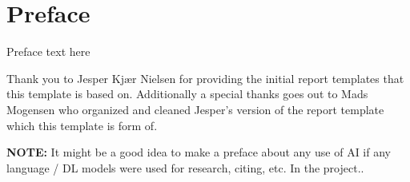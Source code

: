 \chapter*{Preface}\label{ch:preface}

Preface text here\n

\noindent Thank you to Jesper Kjær Nielsen for providing the initial report templates that this template is based on. Additionally a special thanks goes out to Mads Mogensen who organized and cleaned Jesper's version of the report template which this template is form of.\n

\noindent \textbf{NOTE:} It might be a good idea to make a preface about any use of AI if any language / DL models were used for research, citing, etc. In the project..

\signaturelist